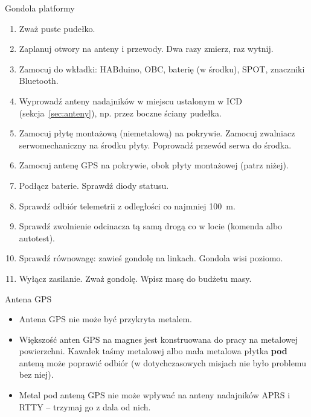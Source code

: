 \begin{sekcja}{Gondola platformy}
\begin{enumerate}
  \item Zważ puste pudełko.
  \item Zaplanuj otwory na anteny i przewody. Dwa razy zmierz, raz wytnij.
  \item Zamocuj do wkładki: HABduino, OBC, baterię (w środku), SPOT, znaczniki Bluetooth.
  \item Wyprowadź anteny nadajników w miejscu ustalonym w ICD (sekcja~\ref{sec:anteny}), np. przez boczne ściany pudełka.
  \item Zamocuj płytę montażową (niemetalową) na pokrywie. Zamocuj zwalniacz serwomechaniczny na środku płyty. Poprowadź przewód serwa do środka.
  \item Zamocuj antenę GPS na pokrywie, obok płyty montażowej (patrz niżej).
  \item Podłącz baterie. Sprawdź diody statusu.
  \item Sprawdź odbiór telemetrii z odległości co najmniej \SI{100}{m}.
  \item Sprawdź zwolnienie odcinacza tą samą drogą co w locie (komenda albo autotest).
  \item Sprawdź równowagę: zawieś gondolę na linkach. Gondola wisi poziomo.
  \item Wyłącz zasilanie. Zważ gondolę. Wpisz masę do budżetu masy.
\end{enumerate}
\end{sekcja}

\begin{sekcja}{Antena GPS}
\begin{itemize}
  \item Antena GPS nie może być przykryta metalem.
  \item Większość anten GPS na magnes jest konstruowana do pracy na metalowej powierzchni. Kawałek taśmy metalowej albo mała metalowa płytka \textbf{pod} anteną może poprawić odbiór (w dotychczasowych misjach nie było problemu bez niej).
  \item Metal pod anteną GPS nie może wpływać na anteny nadajników APRS i RTTY -- trzymaj go z dala od nich.
\end{itemize}
\end{sekcja}


